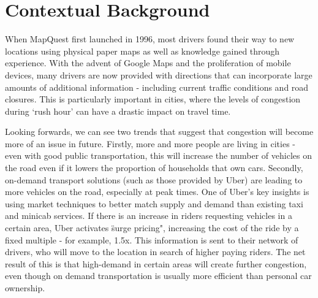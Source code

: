 \documentclass[ %
                    author={Alexander Hill},
                supervisor={Dr. Benjamin Sach},
                    degree={MEng},
                     title={MARMOSET: Multi Agent Routing for Managing Online Smart-cities for Efficient Transportation},
                  subtitle={},
                      type={research},
                      year={2016} ]{dissertation}
\begin{document}
%

\mainmatter


\chapter{Contextual Background}
\label{chap:context}

\vspace{1cm}

\noindent
When MapQuest first launched in 1996, most drivers found their way to new
locations using physical paper maps as well as knowledge gained through
experience. With the advent of Google Maps and the proliferation of mobile
devices, many drivers are now provided with directions that can incorporate
large amounts of additional information - including current traffic conditions
and road closures. This is particularly important in cities, where the levels of
congestion during `rush hour' can have a drastic impact on travel time.

Looking forwards, we can see two trends that suggest that congestion will become
more of an issue in future. Firstly, more and more people are living in cities -
even with good public transportation, this will increase the number of vehicles
on the road even if it lowers the proportion of households that own cars.
Secondly, on-demand transport solutions (such as those provided by Uber) are
leading to more vehicles on the road, especially at peak times. One of Uber's
key insights is using market techniques to better match supply and demand than
existing taxi and minicab services. If there is an increase in riders requesting
vehicles in a certain area, Uber activates \"surge pricing", increasing the cost
of the ride by a fixed multiple - for example, 1.5x. This information is sent to
their network of drivers, who will move to the location in search of higher
paying riders. The net result of this is that high-demand in certain areas will
create further congestion, even though on demand transportation is usually more
efficient than personal car ownership.
\end{document}
